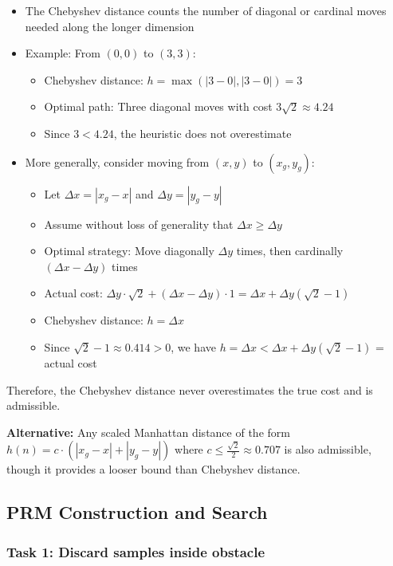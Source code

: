 \documentclass[11pt]{article}
\begin{document}
\begin{itemize}
    \item The Chebyshev distance counts the number of diagonal or cardinal moves needed along the longer dimension
    \item Example: From $(0,0)$ to $(3,3)$:
    \begin{itemize}
        \item Chebyshev distance: $h = \max(|3-0|, |3-0|) = 3$
        \item Optimal path: Three diagonal moves with cost $3\sqrt{2} \approx 4.24$
        \item Since $3 < 4.24$, the heuristic does not overestimate
    \end{itemize}
    \item More generally, consider moving from $(x, y)$ to $(x_g, y_g)$:
    \begin{itemize}
        \item Let $\Delta x = |x_g - x|$ and $\Delta y = |y_g - y|$
        \item Assume without loss of generality that $\Delta x \geq \Delta y$
        \item Optimal strategy: Move diagonally $\Delta y$ times, then cardinally $(\Delta x - \Delta y)$ times
        \item Actual cost: $\Delta y \cdot \sqrt{2} + (\Delta x - \Delta y) \cdot 1 = \Delta x + \Delta y(\sqrt{2} - 1)$
        \item Chebyshev distance: $h = \Delta x$
        \item Since $\sqrt{2} - 1 \approx 0.414 > 0$, we have $h = \Delta x < \Delta x + \Delta y(\sqrt{2} - 1)$ = actual cost
    \end{itemize}
\end{itemize}

Therefore, the Chebyshev distance never overestimates the true cost and is admissible.

\textbf{Alternative:} Any scaled Manhattan distance of the form $h(n) = c \cdot (|x_g - x| + |y_g - y|)$ where $c \leq \frac{\sqrt{2}}{2} \approx 0.707$ is also admissible, though it provides a looser bound than Chebyshev distance.

\subsection{PRM Construction and Search}

\subsubsection*{Task 1: Discard samples inside obstacle}
\end{document}
